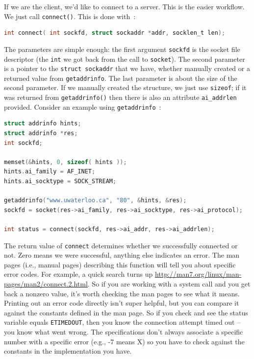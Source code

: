 If we are the client, we'd like to connect to a server. This is the easier workflow. We just call \texttt{connect()}. This is done with~\cite{apunix}:

\begin{lstlisting}[language=C]
int connect( int sockfd, struct sockaddr *addr, socklen_t len); 
\end{lstlisting}

The parameters are simple enough: the first argument \texttt{sockfd} is the socket file descriptor (the \texttt{int} we got back from the call to \texttt{socket}). The second parameter is a pointer to the \texttt{struct sockaddr} that we have, whether manually created or a returned value from \texttt{getaddrinfo}. The last parameter is about the size of the second parameter. If we manually created the structure, we just use \texttt{sizeof}; if it was returned from \texttt{getaddrinfo()} then there is also an attribute \texttt{ai\_addrlen} provided. Consider an example using \texttt{getaddrinfo}~\cite{getaddrinfo}:

\begin{lstlisting}[language=C]
struct addrinfo hints;
struct addrinfo *res;
int sockfd;

memset(&hints, 0, sizeof( hints ));
hints.ai_family = AF_INET;
hints.ai_socktype = SOCK_STREAM;

getaddrinfo("www.uwaterloo.ca", "80", &hints, &res);
sockfd = socket(res->ai_family, res->ai_socktype, res->ai_protocol);

int status = connect(sockfd, res->ai_addr, res->ai_addrlen);
\end{lstlisting}

The return value of \texttt{connect} determines whether we successfully connected or not. Zero means we were successful, anything else indicates an error. The man pages (i.e., manual pages) describing this function will tell you about specific error codes. For example, a quick search turns up \url{http://man7.org/linux/man-pages/man2/connect.2.html}. So if you are working with a system call and you get back a nonzero value, it's worth checking the man pages to see what it means. Printing out an error code directly isn't super helpful, but you can compare it against the constants defined in the man page. So if you check and see the status variable equals \texttt{ETIMEDOUT}, then you know the connection attempt timed out -- you know what went wrong. The specifications don't always associate a specific number with a specific error (e.g., -7 means X) so you have to check against the constants in the implementation you have.

